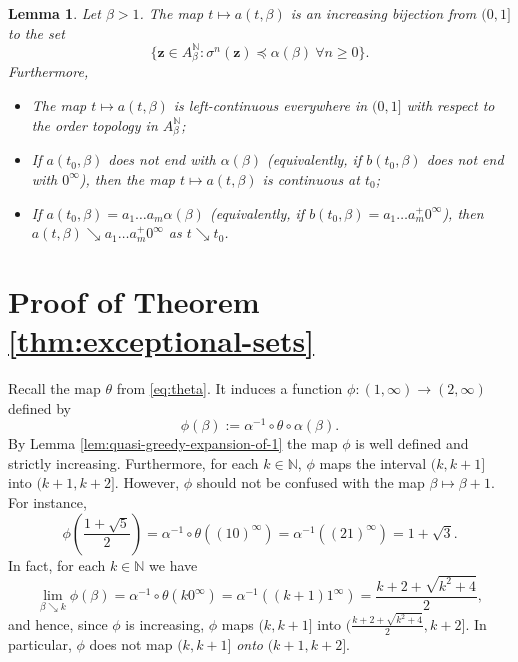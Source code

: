 \documentclass[12pt]{amsart}
\newtheorem{lemma}[theorem]{Lemma}
\theoremstyle{definition}
\theoremstyle{remark}
\numberwithin{equation}{section}
\newcommand{\N}{\ensuremath{\mathbb{N}}}
\newcommand{\z}{\mathbf{z}}
\newcommand{\f}{\infty}
\newcommand{\al}{\alpha}
\newcommand{\lle}{\preccurlyeq}
\newcommand{\si}{\sigma}
\begin{document}
{\begin{lemma} \label{lem:quasi-greedy-expansion}
Let $\beta>1$. The map $t\mapsto a(t,\beta)$ is an increasing bijection from $(0,1]$ to the set
\[
\big\{\z\in A_\beta^\N: \si^n(\z)\lle \al(\beta)~\forall n\ge 0\big\}.
\]
Furthermore,
\begin{itemize}
  \item [{\rm(i)}] The map $t\mapsto a(t,\beta)$ is left-continuous everywhere in $(0,1]$ with respect to the order topology in $A_\beta^\N$;
  \item [{\rm(ii)}] If $a(t_0,\beta)$ does not end with $\al(\beta)$ (equivalently, if $b(t_0,\beta)$ does not end with $0^\f$), then the map $t\mapsto a(t,\beta)$ is continuous at $t_0$;
	\item [{\rm(iii)}] If $a(t_0,\beta)=a_1\dots a_m \al(\beta)$ (equivalently, if $b(t_0,\beta)=a_1\dots a_m^+0^\f$), then $a(t, \beta)\searrow a_1\dots a_m^+0^\f$ as $t\searrow t_0$.
\end{itemize}
\end{lemma}


\section{Proof of Theorem \ref{thm:exceptional-sets}} \label{sec:exceptional-set-proofs}

Recall the map $\theta$ from \eqref{eq:theta}. It induces a function $\phi:(1,\f)\to(2,\f)$ defined by
\[
\phi(\beta):=\al^{-1}\circ \theta \circ \al(\beta).
\]
By Lemma \ref{lem:quasi-greedy-expansion-of-1} the map $\phi$ is well defined and strictly increasing.
Furthermore, for each $k\in\N$, $\phi$ maps the interval $(k,k+1]$ into $(k+1,k+2]$. 
However, $\phi$ should not be confused with the map $\beta\mapsto \beta+1$. For instance,
\[
\phi\left(\frac{1+\sqrt{5}}{2}\right)=\al^{-1}\circ\theta((10)^\f)=\al^{-1}((21)^\f)=1+\sqrt{3}.
\]
In fact, for each $k\in\N$ we have
\[
 \lim_{\beta\searrow k} \phi(\beta)=\al^{-1}\circ\theta(k0^\f)=\al^{-1}((k+1)1^\f)=\frac{k+2+\sqrt{k^2+4}}{2},
\]
and hence, since $\phi$ is increasing, $\phi$ maps $(k,k+1]$ into $(\frac{k+2+\sqrt{k^2+4}}{2},k+2]$. %
In particular, $\phi$ does not map $(k,k+1]$ {\em onto} $(k+1,k+2]$.


}
\end{document}
